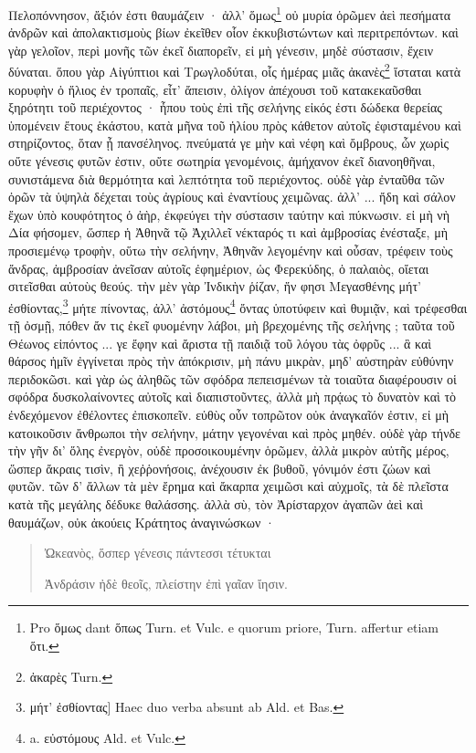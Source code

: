 \documentclass[a4paper, 11pt, oneside, polutonikogreek, german]{article}
\begin{document}
Πελοπόννησον, ἄξιόν ἐστι θαυμάζειν · ἀλλ' ὅμως\footnote{Pro ὅμως dant ὅπως Turn. et Vulc. e quorum priore, Turn. affertur etiam ὅτι.} οὐ μυρία ὁρῶμεν ἀεὶ πεσήματα ἀνδρῶν καὶ ἀπολακτισμοὺς βίων ἐκεῖθεν οἷον ἐκκυβιστώντων καὶ περιτρεπόντων. καὶ γὰρ γελοῖον, περὶ μονῆς τῶν ἐκεῖ διαπορεῖν, εἰ μὴ γένεσιν, μηδὲ σύστασιν, ἔχειν δύναται. ὅπου γὰρ Αἰγύπτιοι καὶ Τρωγλοδύται, οἷς ἡμέρας μιᾶς ἀκανὲς\footnote{ἀκαρὲς Turn.} ἵσταται κατὰ κορυφὴν ὁ ἥλιος ἐν τροπαῖς, εἶτ' ἄπεισιν, ὀλίγον ἀπέχουσι τοῦ κατακεκαῦσθαι ξηρότητι τοῦ περιέχοντος · ἦπου τοὺς ἐπὶ τῆς σελήνης εἰκός ἐστι δώδεκα θερείας ὑπομένειν ἔτους ἑκάστου, κατὰ μῆνα τοῦ ἡλίου πρὸς κάθετον αὐτοῖς ἐφισταμένου καὶ στηρίζοντος, ὅταν ᾖ πανσέληνος. πνεύματά γε μὴν καὶ νέφη καὶ ὄμβρους, ὧν χωρὶς οὔτε γένεσις φυτῶν ἐστιν, οὔτε σωτηρία γενομένοις, ἀμήχανον ἐκεῖ διανοηθῆναι, συνιστάμενα διὰ θερμότητα καὶ λεπτότητα τοῦ περιέχοντος. οὐδὲ γὰρ ἐνταῦθα τῶν ὀρῶν τὰ ὑψηλὰ δέχεται τοὺς ἀγρίους καὶ ἐναντίους χειμῶνας. ἀλλ' ... ἤδη καὶ σάλον ἔχων ὑπὸ κουφότητος ὁ ἀὴρ, ἐκφεύγει τὴν σύστασιν ταύτην καὶ πύκνωσιν. εἰ μὴ νὴ Δία φήσομεν, ὥσπερ ἡ Ἀθηνᾶ τῷ Ἀχιλλεῖ νέκταρός τι καὶ ἀμβροσίας ἐνέσταξε, μὴ προσιεμένῳ τροφὴν, οὕτω τὴν σελήνην, Ἀθηνᾶν λεγομένην καὶ οὖσαν, τρέφειν τοὺς ἄνδρας, ἀμβροσίαν ἀνεῖσαν αὐτοῖς ἐφημέριον, ὡς Φερεκύδης, ὁ παλαιὸς, οἴεται σιτεῖσθαι αὐτοὺς θεούς. τὴν μὲν γὰρ Ἰνδικὴν ῥίζαν, ἥν φησι Μεγασθένης μήτ' ἐσθίοντας,\footnote{μήτ' ἐσθίοντας] Haec duo verba absunt ab Ald. et Bas.} μήτε πίνοντας, ἀλλ' ἀστόμους\footnote{a. εὐστόμους Ald. et Vulc.} ὄντας ὑποτύφειν καὶ θυμιᾷν, καὶ τρέφεσθαι τῇ ὀσμῇ, πόθεν ἄν τις ἐκεῖ φυομένην λάβοι, μὴ βρεχομένης τῆς σελήνης ; ταῦτα τοῦ Θέωνος εἰπόντος ... γε ἔφην καὶ ἄριστα τῇ παιδιᾷ τοῦ λόγου τὰς ὀφρῦς ... ἃ καὶ θάρσος ἡμῖν ἐγγίνεται πρὸς τὴν ἀπόκρισιν, μὴ πάνυ μικρὰν, μηδ' αὐστηρὰν εὐθύνην περιδοκῶσι. καὶ γὰρ ὡς ἀληθῶς τῶν σφόδρα πεπεισμένων τὰ τοιαῦτα διαφέρουσιν οἱ σφόδρα δυσκολαίνοντες αὐτοῖς καὶ διαπιστοῦντες, ἀλλὰ μὴ πρᾴως τὸ δυνατὸν καὶ τὸ ἐνδεχόμενον ἐθέλοντες ἐπισκοπεῖν. εὐθὺς οὖν τοπρῶτον οὐκ ἀναγκαῖόν ἐστιν, εἰ μὴ κατοικοῦσιν ἄνθρωποι τὴν σελήνην, μάτην γεγονέναι καὶ πρὸς μηθέν. οὐδὲ γὰρ τήνδε τὴν γῆν δι' ὅλης ἐνεργὸν, οὐδὲ προσοικουμένην ὁρῶμεν, ἀλλὰ μικρὸν αὐτῆς μέρος, ὥσπερ ἄκραις τισὶν, ἢ χεῤῥονήσοις, ἀνέχουσιν ἐκ βυθοῦ, γόνιμόν ἐστι ζώων καὶ φυτῶν. τῶν δ' ἄλλων τὰ μὲν ἔρημα καὶ ἄκαρπα χειμῶσι καὶ αὐχμοῖς, τὰ δὲ πλεῖστα κατὰ τῆς μεγάλης δέδυκε θαλάσσης. ἀλλὰ σὺ, τὸν Ἀρίσταρχον ἀγαπῶν ἀεὶ καὶ θαυμάζων, οὐκ ἀκούεις Κράτητος ἀναγινώσκων ·
\begin{quotation}\small
Ὠκεανὸς, ὅσπερ γένεσις πάντεσσι τέτυκται

Ἀνδράσιν ἠδὲ θεοῖς, πλείστην ἐπὶ γαῖαν ἴησιν.
\end{quotation}
\end{document}
